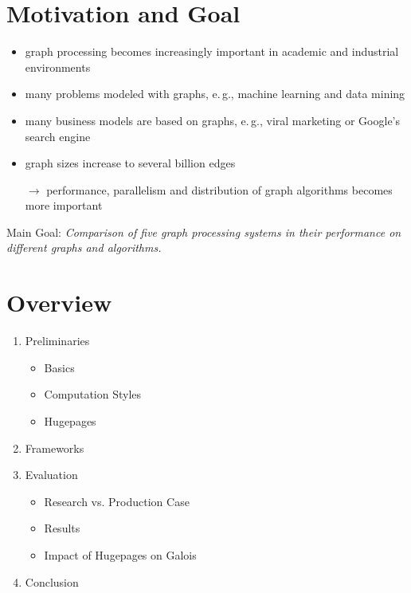 \documentclass{meetings}
\author{S. König, L. Matzner, F. Rollbühler and J. Schmid}
\date{Tuesday, 20\textsuperscript{th} October 2020}
\begin{document}
\section{Motivation and Goal}
\sffamily
\begin{center}
	
	\vfill

	\begin{itemize}
		\item graph processing becomes increasingly important in academic and industrial environments
		\item many problems modeled with graphs, e.\,g.,\xspace machine learning and data mining
		\item many business models are based on graphs, e.\,g.,\xspace viral marketing or Google’s search engine
		\item graph sizes increase to several billion edges 
		\item[$\rightarrow$] performance, parallelism and distribution of graph algorithms becomes more important
	\end{itemize}

	\vfill

	\begin{minipage}{0.6\linewidth}
		\centering
		Main Goal: \itshape  Comparison of five graph processing systems in their performance on different graphs and algorithms.
	\end{minipage}

	\vfill
\end{center}


\section{Overview}
\vfill
\begin{enumerate}
	\item Preliminaries
	\begin{itemize}
	\item Basics
	\item Computation Styles
	\item Hugepages
	\end{itemize}
	\item Frameworks
	\item Evaluation
	\begin{itemize}
	\item Research vs. Production Case
	\item Results
	\item Impact of Hugepages on Galois
	\end{itemize}
	\item Conclusion
\end{enumerate}
\vfill
\end{document}

